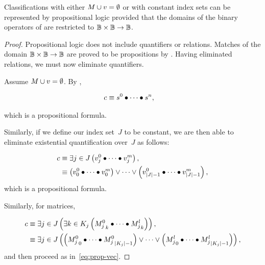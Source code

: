 \begin{theorem}
  Classifications with either $M\cup v=\emptyset$ or with constant index
    sets can be represented by propositional logic provided that the domains
    of the binary operators of  are restricted to
    $\mathbb{B}\times\mathbb{B}\rightarrow\mathbb{B}$.
\end{theorem}
\begin{proof}
  Propositional logic does not include quantifiers or relations.
  Matches of the domain $\mathbb{B}\times\mathbb{B}\rightarrow\mathbb{B}$ are proved to be propositions by
    .
  Having eliminated relations,
    we must now eliminate quantifiers.

  Assume $M\cup v=\emptyset$.
  By ,

  \begin{align*}
    c &\equiv s^0\bullet\cdots\bullet s^n,
  \end{align*}

  \noindent
  which is a propositional formula.

  Similarly,
    if we define our index set~$J$ to be constant,
      we are then able to eliminate existential quantification over~$J$
      as follows:

  \begin{align}\label{eq:prop-vec}
    c &\equiv \Exists{j\in J}{\cpredvecseq}, \nonumber\\
      &\equiv \left(v^0_0\bullet\cdots\bullet v^m_0\right)
              \lor\cdots\lor
              \left(v^0_{|J|-1}\bullet\cdots\bullet v^m_{|J|-1}\right),
  \end{align}
  \noindent
  which is a propositional formula.

  Similarly,
    for matrices,

  \begin{align}
    c &\equiv \Exists{j\in J}{\Exists{k\in K_j}{\cpredmatseq}}, \nonumber\\
      &\equiv \Exists{j\in J}{
                \left({M^0_j}_0\bullet\cdots\bullet{M^0_j}_{|K_j|-1}\right)
                \lor\cdots\lor
                \left({M^l_j}_0\bullet\cdots\bullet{M^l_j}_{|K_j|-1}\right)
              },
  \end{align}
  \noindent
  and then proceed as in~\ref{eq:prop-vec}.
\end{proof}
